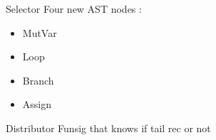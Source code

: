 \documentclass{beamer}
\begin{document}
\begin{frame}{Selector}
Four new AST nodes :
\begin{itemize}
    \item MutVar
    \item Loop
    \item Branch
    \item Assign
\end{itemize}
\end{frame}

\begin{frame}{Distributor}
    Funsig that knows if tail rec or not
\end{frame}
\end{document}

